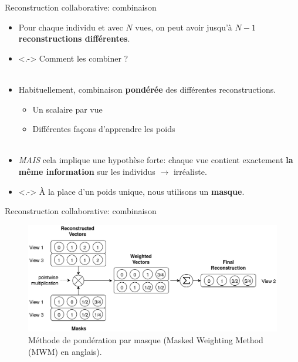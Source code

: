 \documentclass[hyperref={pdfpagelabels=false}]{beamer}
\begin{document}
    \begin{frame}{Reconstruction collaborative: combinaison}
        \begin{itemize}
            \item<+-> Pour chaque individu et avec $N$ vues, on peut avoir 
                jusqu'à $N-1$ \textbf{reconstructions différentes}.
            \item<.-> Comment les combiner ?\\~\\
            \item<+-> Habituellement, combinaison \textbf{pondérée} des 
                différentes reconstructions.
                \begin{itemize}
                    \item Un scalaire par vue
                    \item Différentes façons d'apprendre les poids\\~\\
                \end{itemize}
            \item<+-> \textit{MAIS} cela implique une hypothèse forte: chaque 
                vue contient exactement \textbf{la même information} sur les 
                individus $\rightarrow$ irréaliste.
            \item<.-> À la place d'un poids unique, nous utilisons un 
                \textbf{masque}.
        \end{itemize}
    \end{frame}

    \begin{frame}{Reconstruction collaborative: combinaison}
        \begin{figure}[h]
            \centering
            \includegraphics[scale=.2]{mwm.png}
            \caption{Méthode de pondération par masque (Masked Weighting Method 
                (MWM) en anglais).
            }
        \end{figure}
    \end{frame}
\end{document}
